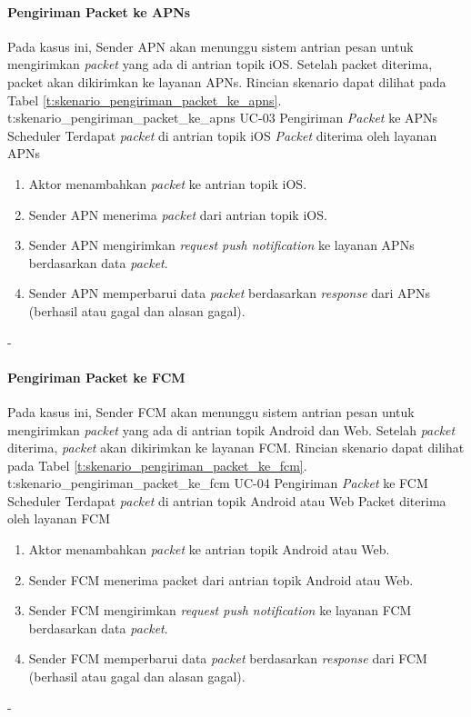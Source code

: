 \paragraph{Pengiriman Packet ke APNs}
\par Pada kasus ini, Sender APN akan menunggu sistem antrian pesan untuk mengirimkan \textit{packet} yang ada di antrian topik iOS. Setelah packet diterima, packet akan dikirimkan ke layanan APNs. Rincian skenario dapat dilihat pada Tabel \ref{t:skenario_pengiriman_packet_ke_apns}.
\tableUcDesc
{t:skenario_pengiriman_packet_ke_apns}
{UC-03}
{Pengiriman \textit{Packet} ke APNs}
{Scheduler}
{Terdapat \textit{packet} di antrian topik iOS}
{\textit{Packet} diterima oleh layanan APNs}
{
\begin{enumerate}
	\item Aktor menambahkan \textit{packet} ke antrian topik iOS.
    \item Sender APN menerima \textit{packet} dari antrian topik iOS.
    \item Sender APN mengirimkan \textit{request push notification} ke layanan APNs berdasarkan data \textit{packet}.
    \item Sender APN memperbarui data \textit{packet} berdasarkan \textit{response} dari APNs (berhasil atau gagal dan alasan gagal).
\end{enumerate}
}
{-}
\clearpage

\paragraph{Pengiriman Packet ke FCM}
\par Pada kasus ini, Sender FCM akan menunggu sistem antrian pesan untuk mengirimkan \textit{packet} yang ada di antrian topik Android dan Web. Setelah \textit{packet} diterima, \textit{packet} akan dikirimkan ke layanan FCM. Rincian skenario dapat dilihat pada Tabel \ref{t:skenario_pengiriman_packet_ke_fcm}.
\tableUcDesc
{t:skenario_pengiriman_packet_ke_fcm}
{UC-04}
{Pengiriman \textit{Packet} ke FCM}
{Scheduler}
{Terdapat \textit{packet} di antrian topik Android atau Web}
{Packet diterima oleh layanan FCM}
{
\begin{enumerate}
	\item Aktor menambahkan \textit{packet} ke antrian topik Android atau Web.
    \item Sender FCM menerima packet dari antrian topik Android atau Web.
    \item Sender FCM mengirimkan \textit{request push notification} ke layanan FCM berdasarkan data \textit{packet}.
    \item Sender FCM memperbarui data \textit{packet} berdasarkan \textit{response} dari FCM (berhasil atau gagal dan alasan gagal).
\end{enumerate}
}
{-}
\clearpage

